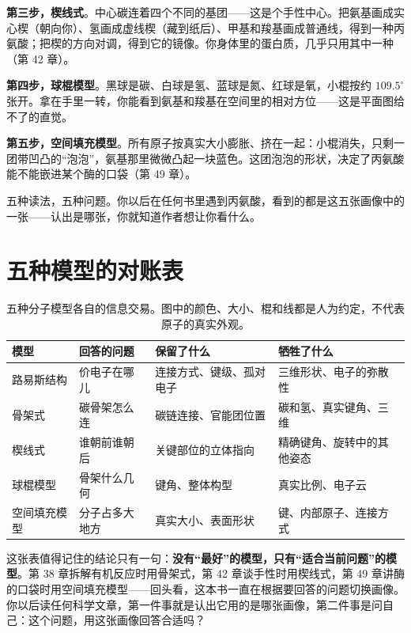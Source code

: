 \textbf{第三步，楔线式}。中心碳连着四个不同的基团——这是个手性中心。把氨基画成实心楔（朝向你）、氢画成虚线楔（藏到纸后）、甲基和羧基画成普通线，得到一种丙氨酸；把楔的方向对调，得到它的镜像。你身体里的蛋白质，几乎只用其中一种（第 42 章）。

\textbf{第四步，球棍模型}。黑球是碳、白球是氢、蓝球是氮、红球是氧，小棍按约 $109.5^{\circ}$ 张开。拿在手里一转，你能看到氨基和羧基在空间里的相对方位——这是平面图给不了的直觉。

\textbf{第五步，空间填充模型}。所有原子按真实大小膨胀、挤在一起：小棍消失，只剩一团带凹凸的“泡泡”，氨基那里微微凸起一块蓝色。这团泡泡的形状，决定了丙氨酸能不能嵌进某个酶的口袋（第 49 章）。

五种读法，五种问题。你以后在任何书里遇到丙氨酸，看到的都是这五张画像中的一张——认出是哪张，你就知道作者想让你看什么。

\section{五种模型的对账表}

\begin{table}[htbp]
\centering
\begin{tabular}{llll}
\toprule
模型 & 回答的问题 & 保留了什么 & 牺牲了什么 \\
\midrule
路易斯结构 & 价电子在哪儿 & 连接方式、键级、孤对电子 & 三维形状、电子的弥散性 \\
骨架式 & 碳骨架怎么连 & 碳链连接、官能团位置 & 碳和氢、真实键角、三维 \\
楔线式 & 谁朝前谁朝后 & 关键部位的立体指向 & 精确键角、旋转中的其他姿态 \\
球棍模型 & 骨架什么几何 & 键角、整体构型 & 真实比例、电子云 \\
空间填充模型 & 分子占多大地方 & 真实大小、表面形状 & 键、内部原子、连接方式 \\
\bottomrule
\end{tabular}
\caption{五种分子模型各自的信息交易。图中的颜色、大小、棍和线都是人为约定，不代表原子的真实外观。}
\end{table}

这张表值得记住的结论只有一句：\textbf{没有“最好”的模型，只有“适合当前问题”的模型}。第 38 章拆解有机反应时用骨架式，第 42 章谈手性时用楔线式，第 49 章讲酶的口袋时用空间填充模型——回头看，这本书一直在根据要回答的问题切换画像。你以后读任何科学文章，第一件事就是认出它用的是哪张画像，第二件事是问自己：这个问题，用这张画像回答合适吗？


